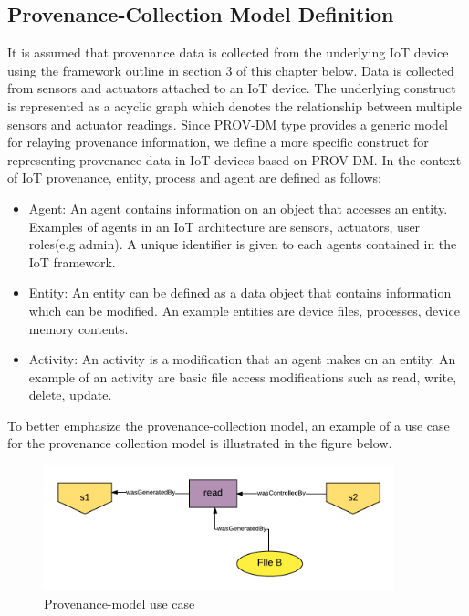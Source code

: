 \subsection{Provenance-Collection Model Definition}

It is assumed that provenance data is collected from the underlying IoT device using the framework outline in section 3 of this chapter below. Data is collected from sensors and actuators attached to an IoT device. The underlying construct is represented as a acyclic graph which denotes the relationship between multiple sensors and actuator readings. Since PROV-DM type provides a generic model for relaying provenance information, we define a more specific construct for representing provenance data in IoT devices based on  PROV-DM. In the context of IoT provenance, entity, process and agent are defined as follows:

\begin{itemize}

\item Agent: An agent contains information on an object that accesses an entity. Examples of agents in an IoT architecture are sensors, actuators, user roles(e.g admin). A unique identifier is given to each agents contained in the IoT framework.

\item Entity:  An entity can be defined as a data object that contains information which can be modified. An example entities are device files, processes, device memory contents.

\item Activity: An activity is a modification that an agent makes on an entity. An example of an activity are basic file access modifications such as read, write, delete, update. 


\end{itemize}


To better emphasize the provenance-collection model, an example of a use case for the provenance collection model is illustrated in the figure below.



\begin{figure}[h]
\begin{center}

\includegraphics[width=4.0in]{provenance_model.png}    
\end{center}
\caption{Provenance-model use case}
\label{autom}
\end{figure}





